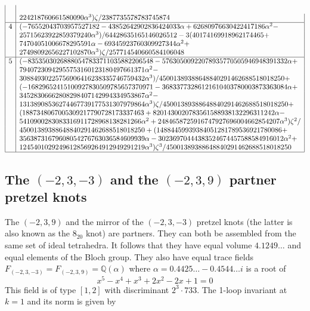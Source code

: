 \documentclass[12pt]{amsart}
\theoremstyle{definition}
\def\BQ{\mathbb Q}
\def\a{\alpha}
\begin{document}
{$$\begin{array}{|c|l|}
\\ &
      224218760661580090 \a^3) \zeta/2387735578783745874 \\ \hline
4 & (-76552043703957527182 - 43852642902836424033 \a + 
    62680976630422417186 \a^2 - 
\\ &
25715623922859379240 \a^3)/
  64428635165146026512 - 3 (40174169918962174465 + 
\\ &
      74704051006678295591 \a - 69345923760309927344 \a^2 + 
\\ &
      27498092656227102870 \a^3) \zeta/257714540660584106048 \\ \hline
5 & (-83535030268880547833711035882206548 - 
    57630500922078935770505946948391332 \a + 
\\ &
    79407230942955753160123180497661371 \a^2 - 
\\ &   30884930225756906416238335746759432 \a^3)/
  45001389388648840291462688518018250 + 
\\ & (-16829652415100927830509785657370971 - 
      36833773286121610403780003873363084 \a + 
\\ &
      34528306662808298407142994334953867 \a^2 - 
\\ &      13138908536274467739177531307979864 \a^3) \zeta/
  45001389388648840291462688518018250 + 
\\ & (1887348067005309217790728173337463 + 
      8201430020783561588938132296311242 \a - 
\\ &      5410900283083316911728968138281266 \a^2 + 
      2484658725916747927696004662854207 \a^3) \zeta^2/
\\ &  45001389388648840291462688518018250 + 
(14884459939384051281789536921780086 + 
\\ &      35638731679608054276763036584609939 \a - 
      30236970444383524674457588584916012 \a^2 + 
\\ &      12454010292496128569264912949291219 \a^3) \zeta^3/
  45001389388648840291462688518018250 \\ \hline
\end{array}
$$
}

\subsection{The $(-2,3,-3)$ and the $(-2,3,9)$ partner pretzel knots}
\label{sub.239}

The $(-2,3,9)$ and the mirror of the $(-2,3,-3)$ pretzel knots (the latter
is also known as the $8_{20}$ knot) are partners. They can both be assembled 
from the same set of ideal tetrahedra. It follows that they have equal
volume $4.1249\dots$ and equal elements of the Bloch group. 
They also have equal trace fields $F_{(-2,3,-3)}=
F_{(-2,3,9)}=\BQ(\a)$ where $\a=0.4425\dots - 0.4544\dots i$ is a root
of
$$
x^5 - x^4 + x^3 + 2 x^2 - 2 x + 1 =0 
$$
This field is of type $[1,2]$ with discriminant $2^3 \cdot 733$.
The 1-loop invariant at $k=1$ and its norm is given by
\end{document}

